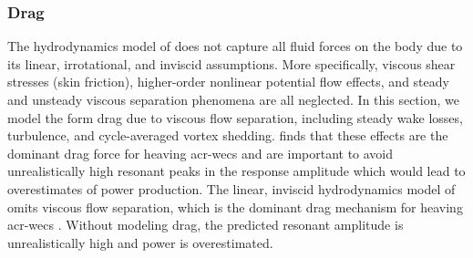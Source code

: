\subsubsection{Drag}\label{sec:drag}
\ifdefined\DISSERTATION
    The hydrodynamics model of  does not capture all fluid forces on the body due to its linear, irrotational, and inviscid assumptions.
    More specifically, viscous shear stresses (skin friction),
    higher-order nonlinear potential flow effects, and
    steady and unsteady viscous separation phenomena are all neglected.
    In this section, we model the form drag due to viscous flow separation, including steady wake losses, turbulence, and cycle-averaged vortex shedding.
    \citet{quartier_influence_2021} finds that these effects are the dominant drag force for heaving \glspl{acr-wec} and are important to avoid unrealistically high resonant peaks in the response amplitude which would lead to overestimates of power production.
\else
    The linear, inviscid hydrodynamics model of  omits viscous flow separation, which is the dominant drag mechanism for heaving \glspl{acr-wec} \citep{quartier_influence_2021}.
    Without modeling drag, the predicted resonant amplitude is unrealistically high and power is overestimated.
\fi

